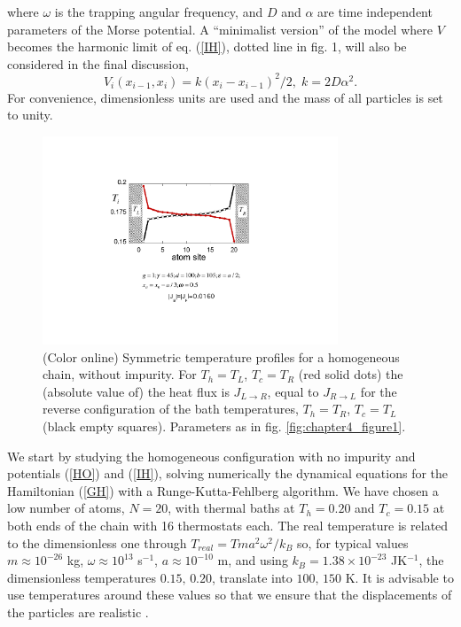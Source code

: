 %
where $\omega$ is the trapping angular frequency, and $D$ and $\alpha$ are time independent parameters of the Morse potential.
A ``minimalist version'' of the model where $V$ becomes the harmonic limit of eq. (\ref{IH}), dotted line in fig. 1,
 will also be considered in the final discussion,
%
\begin{equation}
\label{Vhar}
{V}_i(x_{i-1},x_i)=k(x_i-x_{i-1})^2/2,\;k=2D\alpha^2.
\end{equation}
%
For convenience, dimensionless units are used and the mass of all particles is set to unity.
\begin{figure}
\centering
\includegraphics[width=8.8cm]{Figures/FIG2.pdf}
\caption{(Color online) Symmetric temperature profiles for a homogeneous chain, without impurity.  For $T_{h}=T_{L}$, $T_c=T_R$ (red solid dots) the (absolute value of) the heat flux is $J_{L\rightarrow R}$, equal to $J_{R\rightarrow L}$ for the reverse configuration of the bath temperatures, $T_{h}=T_{R}$, $T_c=T_L$
(black empty squares). Parameters as in fig. \ref{fig:chapter4_figure1}.}
\label{fig:chapter4_figure2}
\end{figure}

We start by studying the homogeneous configuration with no impurity and potentials (\ref{HO}) and (\ref{IH}), solving numerically the dynamical equations for  the Hamiltonian (\ref{GH}) with a Runge-Kutta-Fehlberg algorithm. We have chosen a low number of atoms, $N=20$,  with thermal baths at $T_h=0.20$ and $T_c=0.15$ at both ends of the chain with 16 thermostats each. The real temperature is related to the dimensionless one through $T_{real}=T m a^2 \omega^2/k_B$ so, for typical values  $m\approx10^{-26}$ kg, $\omega \approx 10^{13}$ s$^{-1}$, $a\approx 10^{-10}$ m, and using $k_B =1.38 \times 10^{-23}$ JK$^{-1}$,
the dimensionless temperatures $0.15,\, 0.20$, translate into $100,\, 150$ K. It is advisable to use temperatures around these values so that we ensure that the displacements of the particles are realistic \cite{Casati1984}.


